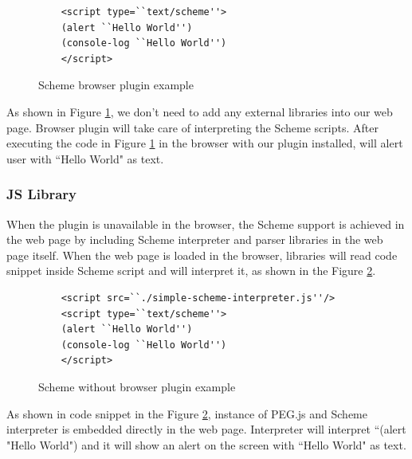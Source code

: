 \begin{figure}[h]
	\begin{lstlisting}  
	<script type=``text/scheme''>
	(alert ``Hello World'')
	(console-log ``Hello World'')
	</script>
	\end{lstlisting}
	\caption{Scheme browser plugin example}
	\label{fig:browserpluginscheme}
\end{figure}


As shown in Figure \ref{fig:browserpluginscheme}, we don't need to add any external libraries into our web page. Browser plugin will take care of interpreting the Scheme scripts. After executing the code in Figure \ref{fig:browserpluginscheme} in the browser with our plugin installed, will alert user with ``Hello World" as text.


\subsubsection{JS Library}

When the plugin is unavailable in the browser, the Scheme support is achieved in the web page by including Scheme interpreter and parser libraries in the web page itself. When the web page is loaded in the browser, libraries will read code snippet inside Scheme script and will interpret it, as shown in the Figure \ref{fig:browserwithoutpluginscheme}. 

\begin{figure}[h]
	\begin{lstlisting} 
	<script src=``./simple-scheme-interpreter.js''/> 
	<script type=``text/scheme''>
	(alert ``Hello World'')
	(console-log ``Hello World'')
	</script>
	\end{lstlisting}
	\caption{Scheme without browser plugin example}
	\label{fig:browserwithoutpluginscheme}
\end{figure}



As shown in code snippet in the Figure \ref{fig:browserwithoutpluginscheme}, instance of PEG.js and Scheme interpreter is embedded directly in the web page. Interpreter will interpret ``(alert "Hello World") and it will show an alert on the screen with ``Hello World" as text.